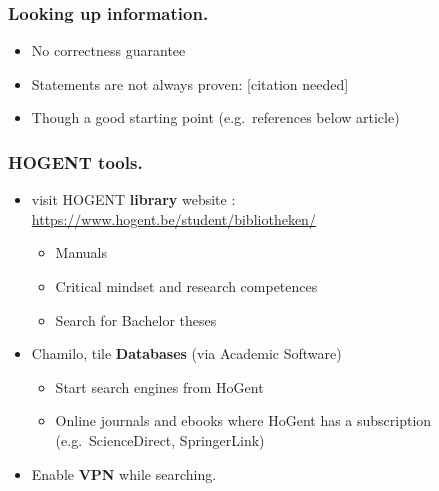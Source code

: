 \documentclass[aspectratio=169]{beamer}
\begin{document}
\begin{frame}
    \frametitle{Looking up information.}


    {\pause}

    \begin{itemize}
        \item No correctness guarantee
        \item Statements are not always proven: [citation needed]
        \item \alert{Though} a good starting point (e.g.\ references below article)
    \end{itemize}
\end{frame}

\begin{frame}
    \frametitle{HOGENT tools.}

    \begin{itemize}
        \item<+-> visit HOGENT \textbf{library} website : \url{https://www.hogent.be/student/bibliotheken/}
            \begin{itemize}
                \item Manuals
                \item Critical mindset and research competences
                \item Search for Bachelor theses
            \end{itemize}
        \item<+-> Chamilo, tile \textbf{Databases} (via Academic Software)
            \begin{itemize}
                \item Start search engines from HoGent
                \item Online journals and ebooks where HoGent has a subscription (e.g.~ScienceDirect, SpringerLink)
            \end{itemize}
        \item<+-> Enable \textbf{VPN} while searching.
    \end{itemize}
\end{frame}
\end{document}

